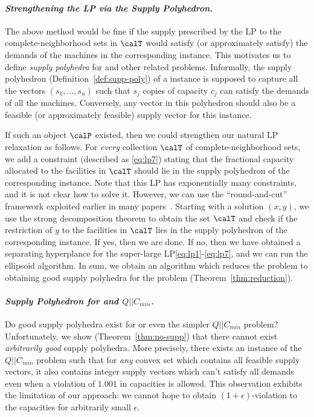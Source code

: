 \paragraph{\emph{Strengthening the LP via the Supply Polyhedron.}}
The above method would be fine if the supply  prescribed by the LP to the complete-neighborhood sets in $\calT$ would satisfy (or approximately satisfy) the demands of the machines in the corresponding \cckp instance. This motivates us  to define {\em supply polyhedra} for \cckp and other related problems. Informally, the supply polyhedron (Definition~\ref{def:supp-poly}) of a \cckp instance is supposed to capture all the vectors $(s_1,\ldots,s_n)$ such that $s_j$ copies of capacity $c_j$ can satisfy the demands of all the machines. Conversely, any vector in this polyhedron should also be a feasible (or approximately feasible) supply vector for this instance.

 If such an object $\calP$ existed, then we could strengthen our natural LP relaxation as follows. For {\em every} collection $\calT$ of complete-neighborhood sets, we add a constraint (described as \eqref{eq:lp7}) stating that the fractional capacity allocated to the facilities in $\calT$ should
 lie in the supply polyhedron of the corresponding \cckp instance. Note that this LP has exponentially many constraints, and it is not clear how to solve it. However, we can use the ``round-and-cut'' framework exploited earlier in many papers~\cite{CarrFLP00, ChakrabartyCKK11, AnSS14, DemirciL16, Li15, Li16}. Starting with a solution $(x,y)$, we use the strong decomposition theorem to obtain the set $\calT$ and check if the restriction of $y$ to the facilities in $\calT$ lies in the supply polyhedron of the corresponding \cckp instance. If yes, then we are done.
 If no, then we have obtained a separating hyperplance for the super-large LP\eqref{eq:lp1}-\eqref{eq:lp7}, and we can run the ellipsoid algorithm. In sum, we obtain an algorithm which reduces the \mckc problem to obtaining good supply polyhedra for the \cckp problem (Theorem~\ref{thm:reduction}).%

\paragraph{\emph{Supply Polyhedron for \cckp and $Q||C_{min}$.}}
Do good supply polyhedra exist for \cckp or even the simpler $Q||C_{min} $ problem? Unfortunately, we show (Theorem~\ref{thm:no-supp}) that there cannot exist {\em arbitrarily good} supply polyhedra. More precisely, there exists an instance of the $Q||C_{min}$ problem such that
for {\em any} convex set which contains all feasible supply vectors, it also contains integer supply vectors which can't satisfy all demands even when a violation of $1.001$ in capacities  is allowed. This observation exhibits the limitation of our approach: we cannot hope to obtain $(1+\epsilon)$-violation to the capacities for arbitrarily small $\epsilon$.

